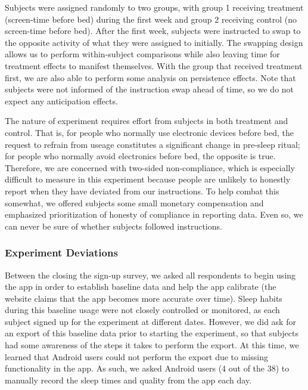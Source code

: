 \documentclass[]{article}
\begin{document}
Subjects were assigned randomly to two groups, with group 1 receiving
treatment (screen-time before bed) during the first week and group 2
receiving control (no screen-time before bed). After the first week,
subjects were instructed to swap to the opposite activity of what they
were assigned to initially. The swapping design allows us to perform
within-subject comparisons while also leaving time for treatment effects
to manifest themselves. With the group that received treatment first, we
are also able to perform some analysis on persistence effects. Note that
subjects were not informed of the instruction swap ahead of time, so we
do not expect any anticipation effects.

The nature of experiment requires effort from subjects in both treatment
and control. That is, for people who normally use electronic devices
before bed, the request to refrain from useage constitutes a significant
change in pre-sleep ritual; for people who normally avoid electronics
before bed, the opposite is true. Therefore, we are concerned with
two-sided non-compliance, which is especially difficult to measure in
this experiment because people are unlikely to honestly report when they
have deviated from our instructions. To help combat this somewhat, we
offered subjects some small monetary compensation and emphasized
prioritization of honesty of compliance in reporting data. Even so, we
can never be sure of whether subjects followed instructions.

\hypertarget{experiment-deviations}{%
\subsubsection{Experiment Deviations}\label{experiment-deviations}}

Between the closing the sign-up survey, we asked all respondents to
begin using the app in order to establish baseline data and help the app
calibrate (the website claims that the app becomes more accurate over
time). Sleep habits during this baseline usage were not closely
controlled or monitored, as each subject signed up for the experiment at
different dates. However, we did ask for an export of this baseline data
prior to starting the experiment, so that subjects had some awareness of
the steps it takes to perform the export. At this time, we learned that
Android users could not perform the export due to missing functionality
in the app. As such, we asked Android users (4 out of the 38) to
manually record the sleep times and quality from the app each day.
\end{document}
